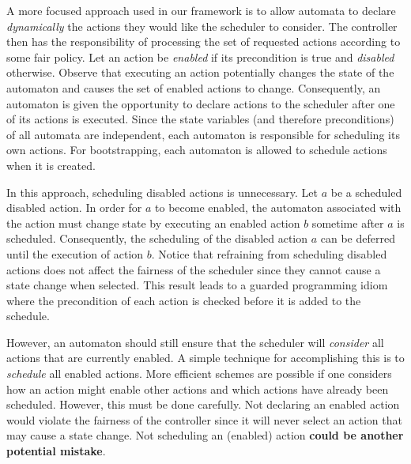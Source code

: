 A more focused approach used in our framework is to allow automata to declare \emph{dynamically} the actions they would like the scheduler to consider.
The controller then has the responsibility of processing the set of requested actions according to some fair policy.
Let an action be \emph{enabled} if its precondition is true and \emph{disabled} otherwise.
Observe that executing an action potentially changes the state of the automaton and causes the set of enabled actions to change.
Consequently, an automaton is given the opportunity to declare actions to the scheduler after one of its actions is executed.
Since the state variables (and therefore preconditions) of all automata are independent, each automaton is responsible for scheduling its own actions.
For bootstrapping, each automaton is allowed to schedule actions when it is created.

In this approach, scheduling disabled actions is unnecessary.
Let $a$ be a scheduled disabled action.
In order for $a$ to become enabled, the automaton associated with the action must change state by executing an enabled action $b$ sometime after $a$ is scheduled.
Consequently, the scheduling of the disabled action $a$ can be deferred until the execution of action $b$.
Notice that refraining from scheduling disabled actions does not affect the fairness of the scheduler since they cannot cause a state change when selected.
This result leads to a guarded programming idiom where the precondition of each action is checked before it is added to the schedule.

However, an automaton should still ensure that the scheduler will \emph{consider} all actions that are currently enabled.
A simple technique for accomplishing this is to \emph{schedule} all enabled actions.
More efficient schemes are possible if one considers how an action might enable other actions and which actions have already been scheduled.
However, this must be done carefully.
Not declaring an enabled action would violate the fairness of the controller since it will never select an action that may cause a state change.
Not scheduling an (enabled) action \textbf{could be another potential mistake}.

